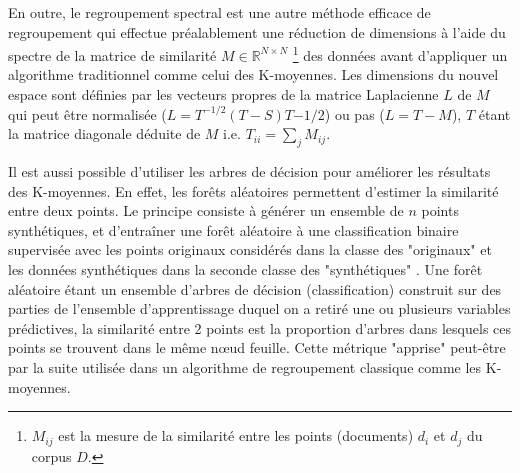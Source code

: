En outre, le regroupement spectral est une autre méthode efficace de regroupement qui effectue préalablement une réduction de dimensions à l'aide du spectre de la matrice de similarité $M \in \mathbb{R}^{N \times N}$ \footnote{$M_{ij}$ est la mesure de la similarité entre les points (documents) $d_i$ et $d_j$ du corpus $D$.} des données  avant d'appliquer un algorithme traditionnel comme celui des K-moyennes. Les dimensions du nouvel espace sont définies par les vecteurs propres de la matrice Laplacienne $L$ de $M$ \citep{shi2000spectralClustering, von2007tutorialSpectralClustering} qui peut être normalisée ($L = T^{-1/2}(T-S)T{-1/2}$) ou pas ($L = T - M$), $T$ étant la matrice diagonale déduite de $M$ i.e. $T_{ii} = \sum\limits_j M_{ij}$. 

Il est aussi possible d'utiliser les arbres de décision pour améliorer les résultats des K-moyennes. En effet, les forêts aléatoires \citep{breiman2001randomforest} permettent d'estimer la similarité entre deux points. Le principe consiste à générer un ensemble de $n$ points synthétiques, et d'entraîner une forêt aléatoire à une classification binaire supervisée avec les points originaux considérés dans la classe des "originaux" et les données synthétiques dans la seconde classe des "synthétiques" \citep{afanador2016unsupervisedrandomforest}. Une forêt aléatoire étant un ensemble d'arbres de décision (classification) construit sur des parties de l'ensemble d'apprentissage duquel on a retiré une ou plusieurs variables prédictives, la similarité entre 2 points est la proportion d'arbres dans lesquels ces points se trouvent dans le même nœud feuille. Cette métrique "apprise" peut-être par la suite utilisée dans un algorithme de regroupement classique comme les K-moyennes.


